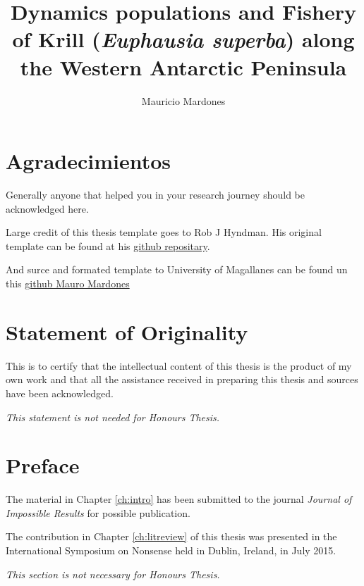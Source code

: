 \documentclass{umagthesis}
\author{Mauricio Mardones}
\title{Dynamics populations and Fishery of Krill (\emph{Euphausia superba}) along the Western Antarctic Peninsula}
\begin{document}

\titlepage

{\sf\tighttoc\doublespacing}

\hypertarget{agradecimientos}{%
\chapter*{Agradecimientos}\label{agradecimientos}}

Generally anyone that helped you in your research journey should be acknowledged here.

Large credit of this thesis template goes to Rob J Hyndman. His original template can be found at his \href{https://github.com/robjhyndman/MonashThesis}{github repositary}.

And surce and formated template to University of Magallanes can be found un this \href{https://github.com/MauroMardones/myThesis}{github Mauro Mardones}

\hypertarget{statement-of-originality}{%
\chapter*{Statement of Originality}\label{statement-of-originality}}

This is to certify that the intellectual content of this thesis is the product of my own work and that all the assistance received in preparing this thesis and sources have been acknowledged.

\emph{This statement is not needed for Honours Thesis.}

\vspace*{2cm}\par\authorname

\hypertarget{preface}{%
\chapter*{Preface}\label{preface}}

The material in Chapter \ref{ch:intro} has been submitted to the journal \emph{Journal of Impossible Results} for possible publication.

The contribution in Chapter \ref{ch:litreview} of this thesis was presented in the International Symposium on Nonsense held in Dublin, Ireland, in July 2015.

\emph{This section is not necessary for Honours Thesis.}
\end{document}
